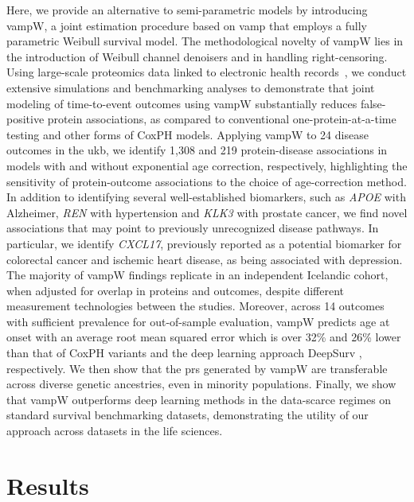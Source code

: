Here, we provide an alternative %
to semi-parametric models by introducing vampW, a joint estimation procedure based on \acrfull{vamp} \cite{rangan_vector_2019,schniter_vector_2016} that employs a fully parametric Weibull survival model. The methodological novelty of vampW lies in the introduction of Weibull channel denoisers and in handling right-censoring. Using large-scale proteomics data linked to electronic health records~\cite{sun_plasma_2023,hu_proteome-wide_2025,wang_blood_2025}, we conduct extensive simulations and benchmarking analyses to demonstrate that joint modeling of time-to-event outcomes using vampW substantially reduces false-positive protein associations, as compared to conventional one-protein-at-a-time testing and other forms of CoxPH models. Applying vampW to 24 disease outcomes in the \acrlong{ukb}, we identify 1,308 and 219 protein-disease associations in models with and without exponential age correction, respectively, highlighting the sensitivity of protein-outcome associations to the choice of age-correction method. In addition to identifying several well-established biomarkers, such as \emph{APOE} with Alzheimer, \emph{REN} with hypertension and \emph{KLK3} with prostate cancer, we find novel associations that may point to previously unrecognized disease pathways. In particular, we identify \emph{CXCL17}, previously reported as a potential biomarker for colorectal cancer and ischemic heart disease, as being associated with depression. The majority of vampW findings replicate in an independent Icelandic cohort, when adjusted for overlap in proteins and outcomes, despite different measurement technologies between the studies. Moreover, across 14 outcomes with sufficient prevalence for out-of-sample evaluation, vampW predicts age at onset with an average root mean squared error which is over 32\% and 26\% lower than that of CoxPH variants and the deep learning approach DeepSurv \cite{katzman_deepsurv_2018}, respectively. We then show that the \acrfull{prs} generated by vampW are transferable across diverse genetic ancestries, even in minority populations. Finally, we show that vampW outperforms deep learning methods in the data-scarce regimes on standard survival benchmarking datasets, demonstrating the utility of our approach across datasets in the life sciences.

\section{Results}
\label{sec:results}

